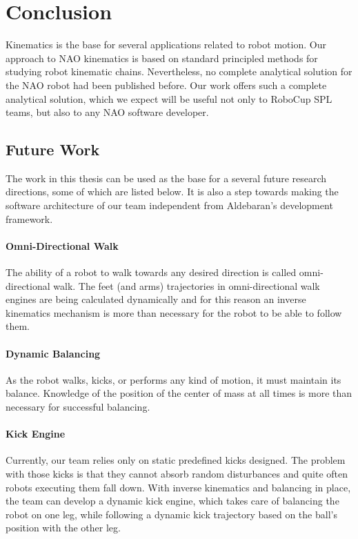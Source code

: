 \chapter{Conclusion}
\label{conclusion}

Kinematics is the base for several applications related to robot motion. Our approach to NAO kinematics is based on standard principled methods for studying robot kinematic chains. Nevertheless, no complete analytical solution for the NAO robot had been published before. Our work offers such a complete analytical solution, which we expect will be useful not only to RoboCup SPL teams, but also to any NAO software developer. 


\section{Future Work}
The work in this thesis can be used as the base for a several future research directions, some of which are listed below. It is also a step towards making the software architecture of our team independent from Aldebaran's development framework.

\subsubsection*{Omni-Directional Walk}

The ability of a robot to walk towards any desired direction is called omni-directional walk. The feet (and arms) trajectories in omni-directional walk engines are being calculated dynamically and for this reason an inverse kinematics mechanism is more than necessary for the robot to be able to follow them. 

\subsubsection*{Dynamic Balancing}

As the robot walks, kicks, or performs any kind of motion, it must maintain its balance. Knowledge of the position of the center of mass at all times is more than necessary for successful balancing.

\subsubsection*{Kick Engine}

Currently, our team relies  only on static predefined kicks designed. The problem with those kicks is that they cannot absorb random disturbances and quite often robots executing them fall down. With inverse kinematics and balancing in place, the team can develop a dynamic kick engine, which takes care of balancing the robot on one leg, while following a dynamic kick trajectory based on the ball's position with the other leg.